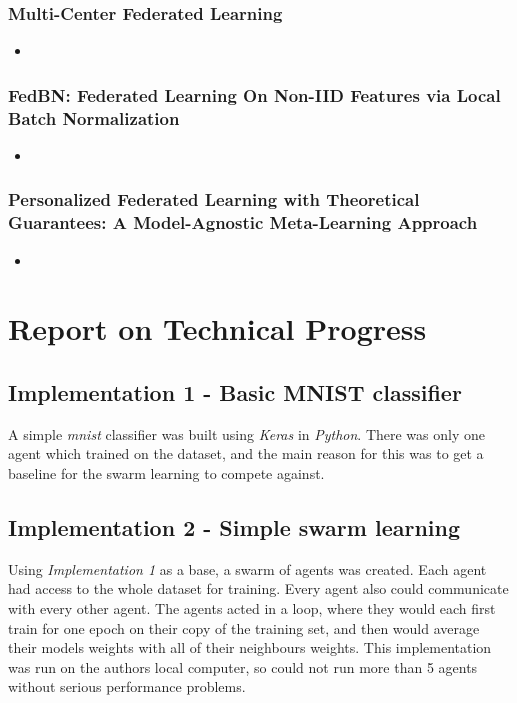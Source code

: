 \documentclass[12pt,a4paper,titlepage]{report}
\begin{document}
	\subsection{Multi-Center Federated Learning \cite{multi_center_fed_learning}}
	\begin{itemize}
		\item 
	\end{itemize}
	
	\subsection{FedBN: Federated Learning On Non-IID Features via Local Batch Normalization \cite{fedbn}}
	\begin{itemize}
		\item 
	\end{itemize}

	\subsection{Personalized Federated Learning with Theoretical Guarantees: A Model-Agnostic Meta-Learning Approach \cite{model_agnostic_meta_learning}}
	\begin{itemize}
		\item 
	\end{itemize}
	
	\chapter{Report on Technical Progress}
	\section{Implementation 1 - Basic MNIST classifier}
	A simple \emph{mnist} classifier was built using \emph{Keras} in \emph{Python}. There was only one agent which trained on the dataset, and the main reason for this was to get a baseline for the swarm learning to compete against.
	\section{Implementation 2 - Simple swarm learning}
	Using \emph{Implementation 1} as a base, a swarm of agents was created. Each agent had access to the whole dataset for training. Every agent also could communicate with every other agent. The agents acted in a loop, where they would each first train for one epoch on their copy of the training set, and then would average their models weights with all of their neighbours weights. This implementation was run on the authors local computer, so could not run more than 5 agents without serious performance problems.
	
\end{document}
